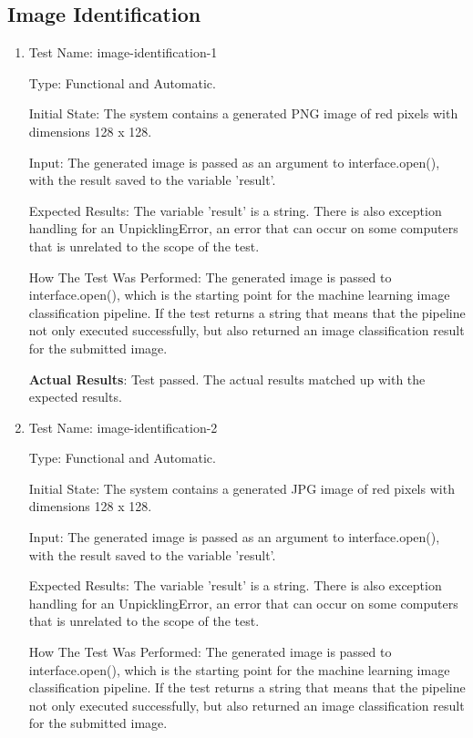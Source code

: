 \documentclass[12pt, titlepage]{article}
\begin{document}
	\subsection{Image Identification}
	\begin{enumerate}
		
        \item{Test Name: image-identification-1}
        
        Type: Functional and Automatic.
		
		Initial State: The system contains a generated PNG image of red pixels with dimensions 128 x 128.
		
		Input: The generated image is passed as an argument to interface.open(), with the result saved to the variable 'result'.
		
		Expected Results: The variable 'result' is a string. There is also exception handling for an UnpicklingError, an error that can occur on some computers that is unrelated to the scope of the test.
		
		How The Test Was Performed: The generated image is passed to interface.open(), which is the starting point for the machine learning image classification pipeline. If the test returns a string that means that the pipeline not only executed successfully, but also returned an image classification result for the submitted image.
		
		\textbf{Actual Results}: Test passed. The actual results matched up with the expected results.
		
        \item{Test Name: image-identification-2}
		
		Type: Functional and Automatic.
		
		Initial State: The system contains a generated JPG image of red pixels with dimensions 128 x 128.
		
		Input: The generated image is passed as an argument to interface.open(), with the result saved to the variable 'result'.
		
		Expected Results: The variable 'result' is a string. There is also exception handling for an UnpicklingError, an error that can occur on some computers that is unrelated to the scope of the test.
		
		How The Test Was Performed: The generated image is passed to interface.open(), which is the starting point for the machine learning image classification pipeline. If the test returns a string that means that the pipeline not only executed successfully, but also returned an image classification result for the submitted image.
		

\end{enumerate}
\end{document}
